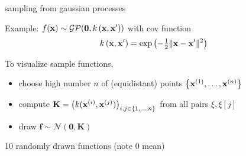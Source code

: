 \documentclass[11pt,compress,t,notes=noshow, xcolor=table]{beamer}
\begin{document}
\begin{framei}[sep=L]{sampling from gaussian processes}
\item Example: $\fx \sim \mathcal{GP}(\zero, \kxxp)$ with cov function
$$ \kxxp = \exp\left(-\tfrac{1}{2}\|\xv - \xv^\prime\|^2\right)$$
\item To visualize sample functions, 
\begin{itemize}
\item choose high number $n$ of (equidistant) points $\xdat$
  \item compute $\Kmat = \left(k(\xi, \xi[j]) \right)_{i,j \in \nset}$ from all pairs $\xi, \xi[j]$ 
  \item draw $\bm{f} \sim \mathcal{N}(\bm{0}, \bm{K})$ 
\end{itemize}
\item 10 randomly drawn functions (note 0 mean)
\vfill
{}
\end{framei}

\endlecture
\end{document}
